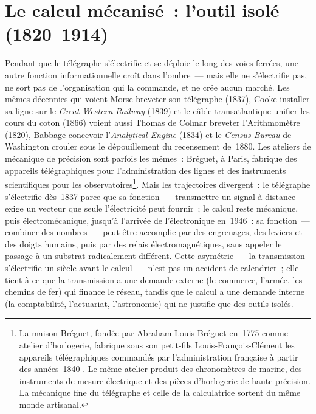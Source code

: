 \section{Le calcul mécanisé~: l'outil isolé (1820--1914)}\label{sec:calculating}

Pendant que le télégraphe s'électrifie et se déploie le long des voies ferrées, une autre fonction informationnelle croît dans l'ombre~--- mais elle ne s'électrifie pas, ne sort pas de l'organisation qui la commande, et ne crée aucun marché. Les mêmes décennies qui voient Morse breveter son télégraphe (1837), Cooke installer sa ligne sur le \emph{Great Western Railway} (1839) et le câble transatlantique unifier les cours du coton (1866) voient aussi Thomas de Colmar breveter l'Arithmomètre (1820), Babbage concevoir l'\emph{Analytical Engine} (1834) et le \emph{Census Bureau} de Washington crouler sous le dépouillement du recensement de~1880. Les ateliers de mécanique de précision sont parfois les mêmes~: Bréguet, à Paris, fabrique des appareils télégraphiques pour l'administration des lignes et des instruments scientifiques pour les observatoires\footnote{La maison Bréguet, fondée par Abraham-Louis Bréguet en~1775 comme atelier d'horlogerie, fabrique sous son petit-fils Louis-François-Clément les appareils télégraphiques commandés par l'administration française à partir des années~1840 \parencite{bertho_histoire_1984}. Le même atelier produit des chronomètres de marine, des instruments de mesure électrique et des pièces d'horlogerie de haute précision. La mécanique fine du télégraphe et celle de la calculatrice sortent du même monde artisanal.}. Mais les trajectoires divergent~: le télégraphe s'électrifie dès~1837 parce que sa fonction~--- transmettre un signal à distance~--- exige un vecteur que seule l'électricité peut fournir~; le calcul reste mécanique, puis électromécanique, jusqu'à l'arrivée de l'électronique en~1946~: sa fonction~--- combiner des nombres~--- peut être accomplie par des engrenages, des leviers et des doigts humains, puis par des relais électromagnétiques, sans appeler le passage à un substrat radicalement différent. Cette asymétrie~--- la transmission s'électrifie un siècle avant le calcul~--- n'est pas un accident de calendrier~; elle tient à ce que la transmission a une demande externe (le commerce, l'armée, les chemins de fer) qui finance le réseau, tandis que le calcul a une demande interne (la comptabilité, l'actuariat, l'astronomie) qui ne justifie que des outils isolés.

